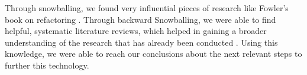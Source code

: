 Through snowballing, we found very influential pieces of research like Fowler's book on refactoring \cite{fowler2018refactoring}.
Through backward Snowballing, we were able to find helpful, systematic literature reviews, which helped in gaining a broader understanding of the research that has already been conducted \cite{mariani2017systematic} \cite{baqais2020automatic} \cite{7833023}.
Using this knowledge, we were able to reach our conclusions about the next relevant steps to further this technology.       